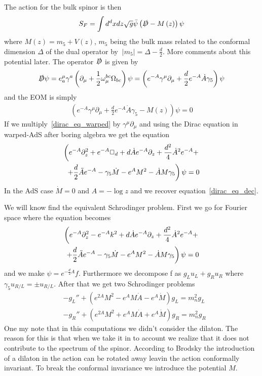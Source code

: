\documentclass[12pt,a4paper]{article}
\begin{document}
The action for the bulk spinor is then
\begin{align}
    S_F = \int d^d x dz \sqrt{g} \bar{\psi} \left( \slashed{D} - M \left(z \right)  \right) \psi
\end{align}
where $M\left(z\right) = m_5 + V\left(z\right)$, $m_5$ being the bulk mass related to the conformal dimension $\Delta$ of the dual operator by $\
|m_5| = \Delta - \frac{d}{2}$. More comments about this potential later.
The operator $\slashed{D}$ is given by
\begin{align}
    \slashed{D} \psi = e^{\mu}_a \gamma^a \left( \partial_\mu + \frac{1}{2} \omega_\mu^{bc} \Omega_{bc} \right) \psi = \left( e^{-A} \gamma^{\mu} \partial_\mu + \frac{d}{2} e^{-A} \dot{A} \gamma_5 \right)\psi
\end{align}
and the EOM is simply
\begin{align}
    \left( e^{-A} \gamma^{\mu} \partial_\mu + \frac{d}{2} e^{-A} \dot{A} \gamma_5 - M\left(z\right) \right)\psi = 0
\label{dirac_eq_warped}
\end{align}
If we multiply~\ref{dirac_eq_warped} by $\gamma^{\mu}\partial_\mu$ and using the Dirac equation in warped-AdS after boring algebra we get the equation
\begin{align}
    \left(e^{-A} \partial_z^2 + e^{-A} \Box_d + d \dot{A} e^{-A} \partial_z + \frac{d^2}{4} \dot{A}^2 e^{-A} + \right. \\ \notag
    \left. +  \frac{d}{2} \ddot{A} e^{-A} - \gamma_5 \dot{M}  - e^{A} M^2 - \dot{A} M \gamma_5 \right) \psi = 0
\end{align}
In the AdS case $\dot{M} = 0$ and $A = -\log z$ and we recover equation~\ref{dirac_eq_dec}.

We will know find the equivalent Schrodinger problem. First we go for Fourier space where the equation becomes
\begin{align}
    \left(e^{-A} \partial_z^2 - e^{-A} k^2  + d \dot{A} e^{-A} \partial_z + \frac{d^2}{4} \dot{A}^2 e^{-A} + \right. \\ \notag
    \left. +  \frac{d}{2} \ddot{A} e^{-A} - \gamma_5 \dot{M}  - e^{A} M^2 - \dot{A} M \gamma_5 \right) \psi = 0
\end{align}
and we make $\psi = e^{- \frac{d}{2} A} f$. Furthermore we decompose f as $g_L u_L + g_R u_R$ where $\gamma_5 u_{R/L} = \pm u_{R/L}$. After that we get two Schrodinger problems
\begin{align}
    &- g_L'' + \left( e^{2A} M^2 - e^{A} M \dot{A} - e^{A} \dot{M} \right)g_L = m_n^2 g_L \\
    &- g_R'' + \left( e^{2A} M^2 + e^{A} M \dot{A} + e^{A} \dot{M} \right)g_R = m_n^2 g_R
\end{align}
One my note that in this computations we didn't consider the dilaton. The reason for this is that when we take it in to account we realize that it does not contribute to the spectrum of the spinor. According to Brodsky the introduction of a dilaton in the action can be rotated away leavin the action conformally invariant. To break the conformal invariance we introduce the potential $M$.
\end{document}
